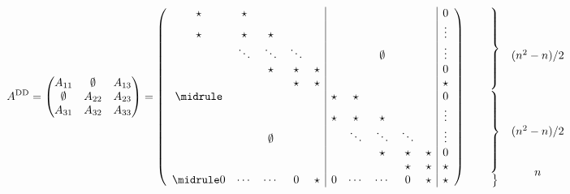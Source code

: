\[
  \Add=
  \begin{pmatrix}
    A_{11}&\emptyset&A_{13}\\
    \emptyset&A_{22}&A_{23}\\
    A_{31}&A_{32}&A_{33}
  \end{pmatrix}=
\left(\begin{array}{ccccc|ccccc|c}
  \star&\star &      &      &      &&&&&&0\\
  \star&\star &\star &      &      &&&&&&\vdots\\
       &\ddots&\ddots&\ddots&      &&&\emptyset&&&\vdots\\
       &      &\star &\star &\star &&&&&&0\\
       &      &      &\star &\star &&&&&&\star\\ \midrule
  &&&&&\star&\star &      &      &      &0\\
  &&&&&\star&\star &\star &      &      &\vdots\\
  &&\emptyset&&&     &\ddots&\ddots&\ddots&      &\vdots\\
  &&&&&     &      &\star &\star &\star &0\\
  &&&&&     &      &      &\star &\star &\star\\ \midrule
  0&\cdots&\cdots&0&\star&0&\cdots&\cdots&0&\star&\star
\end{array}\right)
\begin{array}{c}
  \left.\begin{array}{c}
    \phantom{0}\\ \phantom{\vdots}\\ \phantom{\vdots}\\ \phantom{0}\\ 
    \phantom{\star}\\
  \end{array}\right\} \\
  \left.\begin{array}{c}
    \phantom{0}\\ \phantom{\vdots}\\ \phantom{\vdots}\\ \phantom{0}\\ 
    \phantom{\star}\\
  \end{array}\right\} \\
  \left.\begin{array}{c}
    \phantom{0}\\ 
  \end{array}\right\}
\end{array}
\begin{array}{c}
  \phantom{0}\\ \phantom{\vdots}\\ (n^2-n)/2\\ \phantom{0}\\ \phantom{\star}\\
  \phantom{0}\\ \phantom{\vdots}\\ (n^2-n)/2\\ \phantom{0}\\ \phantom{\star}\\
  n
\end{array}
\]
